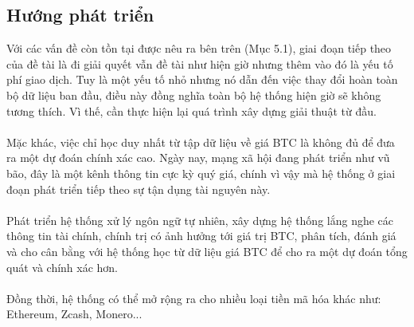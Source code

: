 \subsection{Hướng phát triển}
Với các vấn đề còn tồn tại được nêu ra bên trên (Mục 5.1), giai đoạn tiếp theo 
của đề tài là đi giải quyết vẫn đề tài như hiện giờ nhưng thêm vào đó là yếu 
tố phí giao dịch. Tuy là một yếu tố nhỏ nhưng nó dẫn đến việc thay đổi hoàn toàn 
bộ dữ liệu ban đầu, điều này đồng nghĩa toàn bộ hệ thống hiện giờ sẽ không 
tương thích. Vì thế, cần thực hiện lại quá trình xây dựng giải thuật từ đầu.\\\\
Mặc khác, việc chỉ học duy nhất từ tập dữ liệu về giá BTC là không đủ để 
đưa ra một dự đoán chính xác cao. Ngày nay, mạng xã hội đang phát triển như vũ 
bão, đây là một kênh thông tin cực kỳ quý giá, chính vì vậy mà hệ thống ở giai 
đoạn phát triển tiếp theo sự tận dụng tài nguyên này.\\\\
Phát triển hệ thống xử lý ngôn ngữ tự nhiên, xây dựng hệ thống lắng nghe các 
thông tin tài chính, chính trị có ảnh hưởng tới giá trị BTC, phân tích, 
đánh giá và cho cân bằng với hệ thống học từ dữ liệu giá BTC để cho ra một 
dự đoán tổng quát và chính xác hơn.\\\\
Đồng thời, hệ thống có thể mở rộng ra cho nhiều loại tiền mã hóa khác như: 
Ethereum, Zcash, Monero...